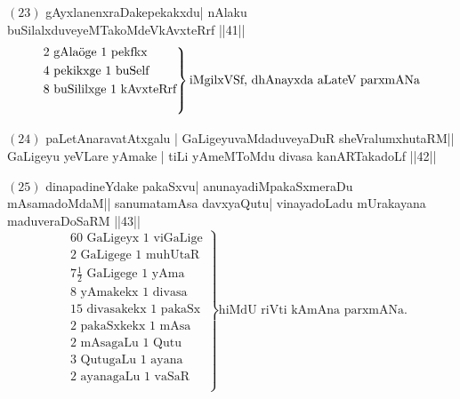 $(23)$ gAyxlanenxraDakepekakxdu| nAlaku buSilalxduveyeMTakoMdeVkAvxteRrf ||41||
\begin{equation*}
\left.
\begin{aligned}
&\text{$2$ gAla\char'366ge $1$ pekfkx}\\
&\text{$4$ pekikxge $1$ buSelf}\\
&\text{$8$ buSililxge $1$ kAvxteRrf}\\ 
&\end{aligned}
\right\}
\text {iMgilxVSf, dhAnayxda aLateV parxmANa}
\end{equation*}
 
$(24)$ paLetAnaravatAtxgalu | GaLigeyuvaMdaduveyaDuR sheVralumxhutaRM|| GaLigeyu yeVLare yAmake | tiLi yAmeMToMdu divasa kanARTakadoLf ||42||

\smallskip

$(25)$ dinapadineYdake pakaSxvu| anunayadiMpakaSxmeraDu mAsamadoMdaM|| sanumatamAsa davxyaQutu| vinayadoLadu mUrakayana maduveraDoSaRM ||43||
\begin{equation*}
\left.
\begin{aligned}
&\text{$60$ GaLigeyx $1$ viGaLige}\\
&\text{$2$ GaLigege $1$ muhUtaR}\\
&\text{$7\frac{1}{2}$ GaLigege $1$ yAma}\\
&\text{$8$ yAmakekx $1$ divasa}\\
&\text{$15$ divasakekx $1$ pakaSx}\\
&\text{$2$ pakaSxkekx $1$ mAsa}\\
&\text{$2$ mAsagaLu $1$ Qutu}\\
&\text{$3$ QutugaLu $1$ ayana}\\
&\text{$2$ ayanagaLu $1$ vaSaR}\\
\end{aligned}
\right\}
\text {hiMdU riVti kAmAna parxmANa.}
\end{equation*} 

